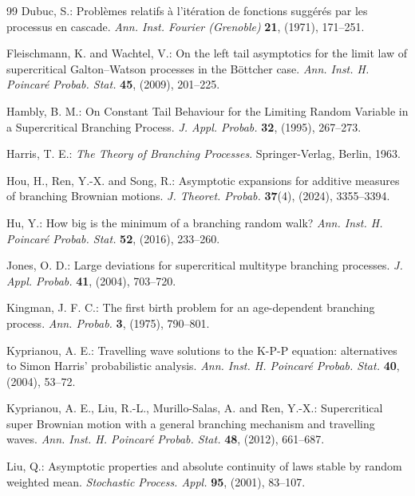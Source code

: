 \documentclass[11pt]{article}
\numberwithin{equation}{section}
\begin{document}
\begin{singlespace}
\begin{thebibliography}{99}
			Dubuc, S.: Probl\`emes relatifs \`a l'it\'eration de fonctions sugg\'er\'es par les processus en cascade. \emph{Ann. Inst. Fourier (Grenoble)} \textbf{21}, (1971), 171--251.
			
			 Fleischmann, K. and Wachtel, V.: On the left tail asymptotics for the limit law of supercritical
			Galton--Watson processes in the B\"ottcher case. \emph{Ann. Inst. H. Poincar\'e Probab. Stat.} \textbf{45}, (2009), 201--225.
			
			
			 Hambly, B. M.: On Constant Tail Behaviour for the Limiting Random Variable in a Supercritical Branching Process. \emph{J. Appl. Probab.} \textbf{32}, (1995), 267--273.
			
			Harris, T. E.: \emph{The Theory of Branching Processes}. Springer-Verlag, Berlin, 1963.
			
			Hou, H., Ren, Y.-X. and Song, R.: Asymptotic expansions for additive measures of branching Brownian motions. \emph{J. Theoret. Probab.} \textbf{37}(4), (2024), 3355--3394.
			
			Hu, Y.: How big is the minimum of a branching random walk? \emph{Ann. Inst. H. Poincar\'e Probab. Stat.} \textbf{52}, (2016), 233--260.
			
			
			
			 Jones, O. D.: Large deviations for supercritical multitype branching processes. \emph{J. Appl. Probab.} \textbf{41}, (2004), 703--720.
			
			Kingman, J. F. C.: The first birth problem for an age-dependent branching process. \emph{Ann. Probab.} \textbf{3}, (1975), 790--801.
			
			
			Kyprianou, A. E.: Travelling wave solutions to the K-P-P equation: alternatives to Simon Harris' probabilistic analysis. \emph{Ann. Inst. H. Poincar\'e Probab. Stat.} \textbf{40}, (2004), 53--72.
			
			Kyprianou, A. E., Liu, R.-L., Murillo-Salas, A. and Ren, Y.-X.: Supercritical super Brownian motion with a general branching mechanism and travelling waves. \emph{Ann. Inst. H. Poincar\'e Probab. Stat.} \textbf{48}, (2012), 661--687.
			
			
			Liu, Q.: Asymptotic properties and absolute continuity of laws stable by random weighted mean. \emph{Stochastic Process. Appl.} \textbf{95}, (2001), 83--107.
			

\end{thebibliography}
\end{singlespace}
\end{document}
